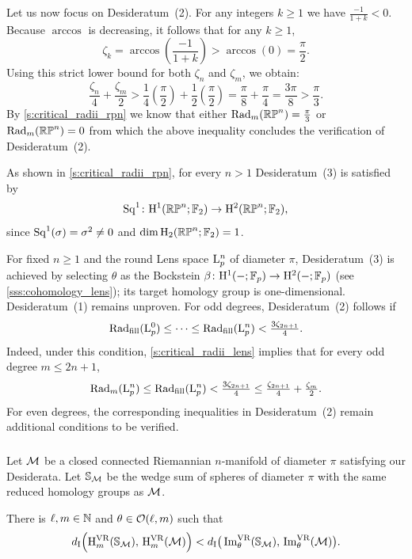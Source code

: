 Let us now focus on Desideratum~(2).
For any integers $k \geq 1$ we have $\frac{-1}{1+k} < 0$.
Because \(\arccos\) is decreasing, it follows that for any $k \geq 1$,
\[
\zeta_k = \arccos\left(\frac{-1}{1+k}\right) > \arccos(0) = \frac{\pi}{2}.
\]
Using this strict lower bound for both $\zeta_n$ and $\zeta_m$, we obtain:
\[
\frac{\zeta_n}{4} + \frac{\zeta_m}{2} > \frac{1}{4}\left(\frac{\pi}{2}\right) + \frac{1}{2}\left(\frac{\pi}{2}\right) = \frac{\pi}{8} + \frac{\pi}{4} = \frac{3\pi}{8} > \frac{\pi}{3}.
\]
By \cref{s:critical_radii_rpn} we know that either \(\mathrm{Rad}_{m}(\mathbb{RP}^n) = \tfrac{\pi}{3}\) or \(\mathrm{Rad}_{m}(\mathbb{RP}^n) = 0\) from which the above inequality concludes the verification of Desideratum~(2).

As shown in \cref{s:critical_radii_rpn}, for every $n>1$ Desideratum~(3) is satisfied by
\[
\mathrm{Sq}^1 \colon \mathrm{H}^1(\mathbb{RP}^n;{\mathbb{F}_2}) \to \mathrm{H}^2(\mathbb{RP}^n;{\mathbb{F}_2}),
\]
since \(\mathrm{Sq}^1(\sigma)=\sigma^2\neq 0\) and \(\dim \operatorname{H}_2(\mathbb{RP}^n;{\mathbb{F}_2})=1\).

\medskip For fixed $n \geq 1$ and the round Lens space $\mathrm{L}^n_p$ of diameter \(\pi\), Desideratum~(3) is achieved by selecting $\theta$ as the Bockstein \(\beta \colon \mathrm{H}^1(-;{\mathbb{F}_p}) \to \mathrm{H}^2(-;{\mathbb{F}_p})\) (see \cref{sss:cohomology_lens}); its target homology group is one-dimensional.
Desideratum~(1) remains unproven.
For odd degrees, Desideratum~(2) follows if
\[
\mathrm{Rad}_{\mathrm{fill}}(\mathrm{L}^0_p) \leq \dotsb \leq \mathrm{Rad}_{\mathrm{fill}}(\mathrm{L}^n_p) < \tfrac{3\zeta_{2n+1}}{4}.
\]
Indeed, under this condition, \cref{s:critical_radii_lens} implies that for every odd degree $m \leq 2n+1$,
\[
\mathrm{Rad}_{m}(\mathrm{L}^n_p) \leq \mathrm{Rad}_{\mathrm{fill}}(\mathrm{L}^n_p) < \tfrac{3\zeta_{2n+1}}{4} \leq \tfrac{\zeta_{2n+1}}{4} + \tfrac{\zeta_{m}}{2}.
\]
For even degrees, the corresponding inequalities in Desideratum~(2) remain additional conditions to be verified.

\subsubsection{}\label{sss:choice of S_M}

Let \(\mathcal{M}\) be a closed connected Riemannian \(n\)-manifold of diameter \(\pi\) satisfying our Desiderata.
Let $\mathbb{S}_{\mathcal{M}}$ be the wedge sum of spheres of diameter \(\pi\) with the same reduced homology groups as $\mathcal{M}$.

\theorem
There is $\ell, m \in \mathbb{N}$ and $\theta \in \mathcal{O}(\ell, m)$ such that
\begin{equation}\label{eq:comparison}
	d_{\mathrm{I}} \Big(\mathrm{H}^{\mathrm{VR}}_{m}(\mathbb{S}_{\mathcal{M}}),\, \mathrm{H}^{\mathrm{VR}}_{m}(\mathcal{M})\Big) < d_{\mathrm{I}} \big(\operatorname{Im}^{\mathrm{VR}}_{\theta}(\mathbb{S}_{\mathcal{M}}),\, \operatorname{Im}^{\mathrm{VR}}_{\theta}(\mathcal{M})\big).
\end{equation}

